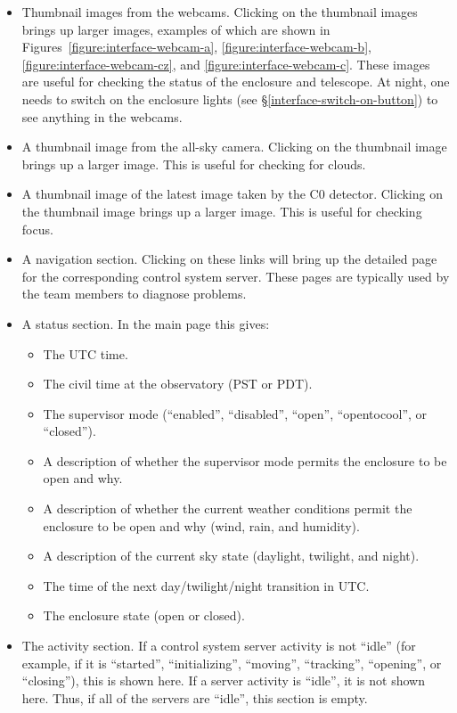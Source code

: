 \begin{itemize}
\item
Thumbnail images from the webcams. Clicking on the thumbnail images brings up larger images, examples of which are shown in Figures~\ref{figure:interface-webcam-a}, \ref{figure:interface-webcam-b}, \ref{figure:interface-webcam-cz}, and \ref{figure:interface-webcam-c}. These images are useful for checking the status of the enclosure and telescope. At night, one needs to switch on the enclosure lights (see \S\ref{interface-switch-on-button}) to see anything in the webcams.  
\item
A thumbnail image from the all-sky camera. Clicking on the thumbnail image brings up a larger image. This is useful for checking for clouds.
\item
A thumbnail image of the latest image taken by the C0 detector. Clicking on the thumbnail image brings up a larger image. This is useful for checking focus.
\item
A navigation section. Clicking on these links will bring up the detailed page for the corresponding control system server. These pages are typically used by the team members to diagnose problems.
\item
A status section. In the main page this gives:
\begin{itemize}
\item
The UTC time.
\item
The civil time at the observatory (PST or PDT).
\item
The supervisor mode (“enabled”, “disabled”, “open”, “opentocool”, or “closed”).
\item
A description of whether the supervisor mode permits the enclosure to be open and why.
\item
A description of whether the current weather conditions permit the enclosure to be open and why (wind, rain, and humidity).
\item
A description of the current sky state (daylight, twilight, and night).
\item
The time of the next day/twilight/night transition in UTC.
\item
The enclosure state (open or closed).
\end{itemize}
\item
The activity section. If a control system server activity is not “idle” (for example, if it is “started”, “initializing”, “moving”, “tracking”, “opening”, or “closing”), this is shown here. If a server activity is “idle”, it is not shown here. Thus, if all of the servers are “idle”, this section is empty.


\end{itemize}
